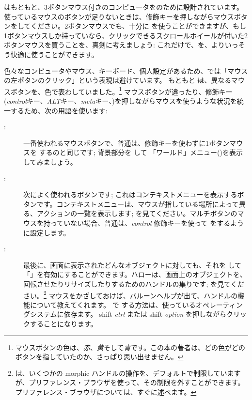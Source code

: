 \documentclass[a4paper,10pt,twoside]{book}
\begin{document}
\st はもともと、3ボタンマウス付きのコンピュータをのために設計されています。使っているマウスのボタンが足りないときは、修飾キーを押しながらマウスボタンを\click してください。2ボタンマウスでも、十分に \pharo を使うことができますが、もし1ボタンマウスしか持っていなら、クリックできるスクロールホイールが付いた2ボタンマウスを買うことを、真剣に考えましょう: これだけで、\pharo を、よりいっそう快適に使うことができます。

色々なコンピュータやマウス、キーボード、個人設定があるため、\pharo では「マウスの左ボタンのクリック」という表現は避けています。
もともと \st は、異なるマウスボタンを、色で表わしていました。\footnote{マウスボタンの色は、\emph{赤}、\emph{黄}そして\emph{青}です。この本の著者は、どの色がどのボタンを指していたのか、さっぱり思い出せません。}
マウスボタンが違ったり、修飾キー(\emph{control}キー、\emph{ALT}キー、\emph{meta}キー、\etc)を押しながらマウスを使うような状況を統一するため、次の用語を使います:

\begin{description}
\item [\click:] 一番使われるマウスボタンで、普通は、修飾キーを使わずに1ボタンマウスを \click するのと同じです; 背景部分を \click して 「ワールド」メニュー()を表示してみましょう。
\item [\actclick:] 次によく使われるボタンです; これはコンテキストメニューを表示するボタンです。コンテキストメニューは、マウスが指している場所によって異る、アクションの一覧を表示します; を見てください。マルチボタンのマウスを持っていない場合、普通は、\emph{control} 修飾キーを使って \actclick をするように設定します。
\item [\metaclick:] 最後に、画面に表示されたどんなオブジェクトに対しても、それを \metaclick して「」を有効にすることができます。ハローは、画面上のオブジェクトを、回転させたりリサイズしたりするためのハンドルの集りです; を見てください。\footnote{\pharo は、いくつかの morphic ハンドルの操作を、デフォルトで制限していますが、プリファレンス・ブラウザを使って、その制限を外すことができます。プリファレンス・ブラウザについては、すぐに述べます。}
マウスをかざしておけば、バルーンヘルプが出て、ハンドルの機能について教えてくれます。
\pharo で \metaclick する方法は、使っているオペレーティングシステムに依存ます。
{\sc shift} \emph{ctrl} または {\sc shift} \emph{option} を押しながらクリックすることになります。
\end{description}
\end{document}
